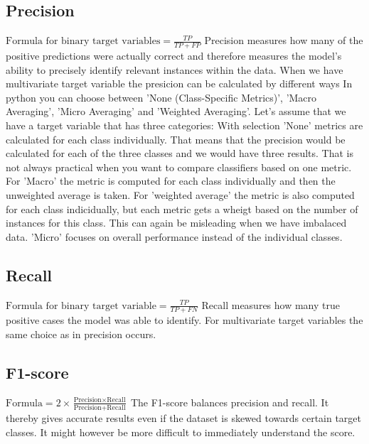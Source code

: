 \documentclass{article}
\begin{document}
\subsection{Precision}
$\text{Formula for binary target variables} = \frac{TP}{TP + FP}$
Precision measures how many of the positive predictions were actually correct and therefore measures the model’s ability to precisely identify relevant instances within the data. 
When we have multivariate target variable the presicion can be calculated by different ways In python you can choose between 'None (Class-Specific Metrics)', 'Macro Averaging', 'Micro Averaging' and 'Weighted  Averaging'. Let's assume that we have a target variable that has three categories:
With selection 'None' metrics are calculated for each class individually. That means that the precision would be calculated for each of the three classes and we would have three results. That is not always practical when you want to compare classifiers based on one metric.
For 'Macro' the metric is computed for each class individually and then the unweighted average is taken. For 'weighted average' the metric is also computed for each class indicidually, but each metric gets a wheigt based on the number of instances for this class. This can again be misleading when we have imbalaced data. 'Micro' focuses on overall performance instead of the individual classes.


\subsection{Recall}
$\text{Formula for binary target variable} = \frac{TP}{TP + FN}$
Recall measures how many true positive cases the model was able to identify. For multivariate target variables the same choice as in precision occurs.


\subsection{F1-score}
$\text{Formula}  = 2 \times \frac{\text{Precision} \times \text{Recall}}{\text{Precision} + \text{Recall}}$
The F1-score balances precision and recall. It thereby gives accurate results even if the dataset is skewed towards certain target classes. It might however be more difficult to immediately understand the score.
\end{document}

